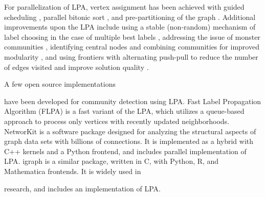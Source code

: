 For parallelization of LPA, vertex assignment has been achieved with guided scheduling \cite{staudt2015engineering}, parallel bitonic sort \cite{soman2011fast}, and pre-partitioning of the graph \cite{kuzmin2015parallelizing}. Additional improvements upon the LPA include using a stable (non-random) mechanism of label choosing in the case of multiple best labels \cite{com-xing14}, addressing the issue of monster communities \cite{com-berahmand18, com-sattari18}, identifying central nodes and combining communities for improved modularity \cite{com-you20}, and using frontiers with alternating push-pull to reduce the number of edges visited and improve solution quality \cite{com-liu20}.

A few open source implementations have been developed for community detection using LPA. Fast Label Propagation Algorithm (FLPA) \cite{traag2023large} is a fast variant of the LPA, which utilizes a queue-based approach to process only vertices with recently updated neighborhoods. NetworKit \cite{staudt2016networkit} is a software package designed for analyzing the structural aspects of graph data sets with billions of connections. It is implemented as a hybrid with C++ kernels and a Python frontend, and includes parallel implementation of LPA. igraph \cite{csardi2006igraph} is a similar package, written in C, with Python, R, and Mathematica frontends. It is widely used in research, and includes an implementation of LPA.

